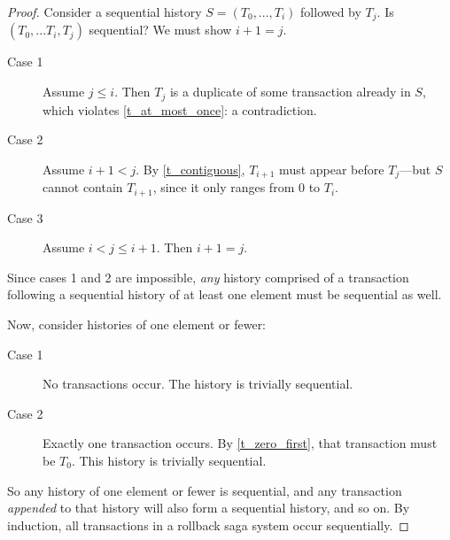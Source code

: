 \documentclass{article}
\begin{document}
\begin{proof}

Consider a sequential history $S = (T_0, ..., T_i)$ followed by $T_j$. Is $(T_0,
... T_i, T_j)$ sequential? We must show $i + 1 = j$.

\begin{description}
  \item[Case 1] Assume $j \le i$. Then $T_j$ is a duplicate of some transaction
already in $S$, which violates \ref{t_at_most_once}: a contradiction.
  \item[Case 2] Assume $i + 1 < j$. By \ref{t_contiguous}, $T_{i + 1}$ must
appear before $T_j$---but $S$ cannot contain $T_{i+1}$, since it only ranges
from $0$ to $T_i$.
  \item[Case 3] Assume $i < j \le i + 1$. Then $i + 1 = j$.
\end{description}

Since cases 1 and 2 are impossible, \textit{any} history comprised of a
transaction following a sequential history of at least one element must be
sequential as well.

Now, consider histories of one element or fewer:

\begin{description}
  \item[Case 1] No transactions occur. The history is trivially sequential.
  \item[Case 2] Exactly one transaction occurs. By \ref{t_zero_first}, that
transaction must be $T_0$. This history is trivially sequential.
\end{description}

So any history of one element or fewer is sequential, and any transaction
\textit{appended} to that history will also form a sequential history, and so
on. By induction, all transactions in a rollback saga system occur
sequentially.

\end{proof}
\end{document}
